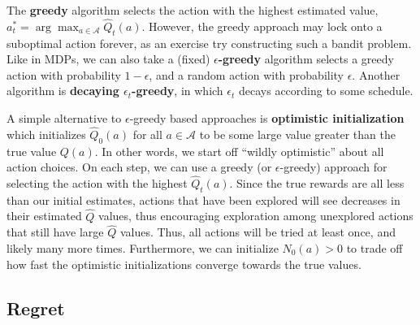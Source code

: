 \documentclass{article}
\begin{document}
The \textbf{greedy} algorithm selects the action with the highest estimated value, $a_t^* = \arg\max_{a \in \mathcal{A}} \hat{Q}_t(a)$. However, the greedy approach may lock onto a suboptimal action forever, as an exercise try constructing such a bandit problem. Like in MDPs, we can also take a (fixed) \textbf{$\epsilon$-greedy} algorithm selects a greedy action with probability $1-\epsilon$, and a random action with probability $\epsilon$. Another algorithm is \textbf{decaying $\epsilon_t$-greedy}, in which $\epsilon_t$ decays according to some schedule.

A simple alternative to $\epsilon$-greedy based approaches is \textbf{optimistic initialization} which initializes $\hat{Q}_0(a)$ for all $a \in \mathcal{A}$ to be some large value greater than the true value $Q(a)$. In other words, we start off ``wildly optimistic'' about all action choices. On each step, we can use a greedy (or $\epsilon$-greedy) approach for selecting the action with the highest $\hat{Q}_t(a)$. Since the true rewards are all less than our initial estimates, actions that have been explored will see decreases in their estimated $\hat{Q}$ values, thus encouraging exploration among unexplored actions that still have large $\hat{Q}$ values. Thus, all actions will be tried at least once, and likely many more times. Furthermore, we can initialize $N_0(a) > 0$ to trade off how fast the optimistic initializations converge towards the true values.

\subsection{Regret}
\end{document}
